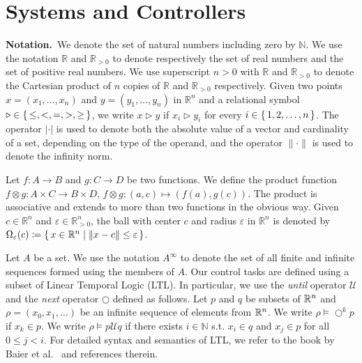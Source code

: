 
\section{Systems and Controllers}

\smallskip
\noindent\textbf{Notation.}\
We denote the set of natural numbers including zero by $\mathbb N$.
We use the notation $\mathbb{R}$ and $\mathbb{R}_{>0}$ to denote respectively the set of real numbers and the set of positive real numbers.
We use superscript $n>0$ with $\mathbb{R}$ and $\mathbb{R}_{>0}$ to denote the Cartesian product of $n$ copies of $\mathbb{R}$ and $\mathbb{R}_{>0}$ respectively.
Given two points $x=(x_1,\ldots, x_n)$ and $y=(y_1,\ldots, y_n)$ in $ \mathbb{R}^n$
and a relational symbol $\triangleright\in \set{\leq, <, = , >, \geq}$, we write $x\triangleright y$ if $x_i\triangleright y_i$ for every $i\in\set{1,2,\ldots,n}$.
The operator $|\cdot |$ is used to denote both the absolute value of a vector and cardinality of a set, depending on the type of the operand, and the operator $\| \cdot \|$ is used to denote the infinity norm.  

Let $f\colon A\to B$ and $g\colon C\to D$ be two functions.
We define the product function $f\otimes g\colon A\times C\to B\times D $, $f\otimes g \colon (a,c)\mapsto (f(a),g(c))$.
The product is associative and extends to more than two functions in the obvious way.
%
Given $c\in \mathbb{R}^n$ and $\varepsilon\in \mathbb{R}_{>0}^{n}$, the ball with center $c$ and radius $\varepsilon$ in $\mathbb{R}^n$ is denoted by 
$\Omega_\varepsilon(c)\coloneqq \set{x \in \mathbb{R}^n \mid  \|x-c\|\leq \varepsilon }$.

Let $A$ be a set.
We use the notation $A^\infty$ to denote the set of all finite and infinite sequences formed using the members of $A$. Our control tasks are defined using a subset of Linear Temporal Logic (LTL). 
In particular, we use the \emph{until} operator $\mathcal{U}$ and the \emph{next} operator $\bigcirc$ defined as follows. 
Let $p$ and $q$ be subsets of $\mathbb{R}^n$ and $\rho=(x_0,x_1,\dots)$ be an infinite sequence of elements from $\mathbb{R}^n$. 
We write $\rho\models\bigcirc^k p$ if $x_k\in p$. We write $\rho\models p\mathcal{U}q$ if there exists 
$i\in\mathbb{N}$ s.t. $x_i\in q$ and $x_j\in p$ for all $0\leq j<i$. 
For detailed syntax and semantics of LTL, we refer to the book by Baier et al.~\cite{baier2008principles} and references therein.


